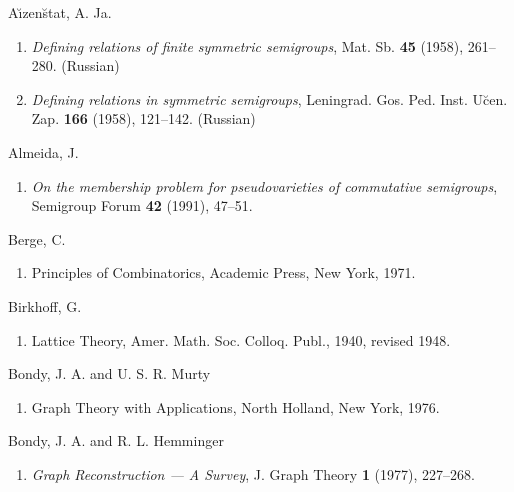 \documentclass{surv-l}
\numberwithin{equation}{section}
\numberwithin{table}{section}
\numberwithin{figure}{section}
\theoremstyle{plain}
\theoremstyle{definition}
\begin{document}
\def\labelenumi{[\theenumi]}

\begin{thebibliography}{}

\item[] A\u{\i}zen\u{s}tat, A. Ja.

\begin{enumerate}
\item \label{bib1} \emph{Defining relations of finite symmetric
semigroups}, Mat. Sb. \textbf{45} (1958), 261--280.
(Russian)

\item \label{bib1a} \emph{Defining relations in symmetric semigroups},
Leningrad. Gos. Ped. Inst. U\u{c}en. Zap. \textbf{166}
(1958), 121--142. (Russian)
\end{enumerate}

\item[] Almeida, J.

\begin{enumerate}
\item \label{bib2} \emph{On the membership problem for pseudovarieties of
commutative semigroups}, Semigroup Forum \textbf{42}
(1991), 47--51.
\end{enumerate}

\item[] Berge, C.

\begin{enumerate}
\item \label{bib3} Principles of Combinatorics, Academic Press, New York,
1971.
\end{enumerate}

\item[] Birkhoff, G.
\begin{enumerate}
\item \label{bib4} Lattice Theory, Amer. Math. Soc. Colloq. Publ., 1940,
revised 1948.
\end{enumerate}

\item[] Bondy, J. A. and U. S. R. Murty
\begin{enumerate}
\item \label{bib5} Graph Theory with Applications, North Holland, New York,
1976.
\end{enumerate}

\item[] Bondy, J. A. and R. L. Hemminger
\begin{enumerate}
\item \label{bib6} \emph{Graph Reconstruction --- A Survey}, J. Graph
Theory \textbf{1} (1977), 227--268.
\end{enumerate}


\end{thebibliography}
\end{document}
